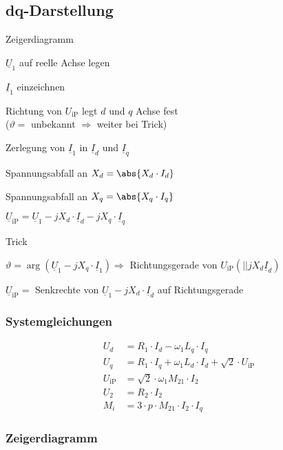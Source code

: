 \begin{sectionbox}
\subsection{dq-Darstellung}
\begin{cookbox}{Zeigerdiagramm}
\item $\underline{U}_1$ auf reelle Achse legen
\item $\underline{I}_1$ einzeichnen
\item Richtung von $U_\text{iP}$ legt $d$ und $q$ Achse fest\\
($\vartheta =$ unbekannt $\Rightarrow$ weiter bei Trick)
\item Zerlegung von $\underline{I}_1$ in $\underline{I}_d$ und $\underline{I}_q$
\item Spannungsabfall an $X_d = \abs{X_d\cdot I_d}$
\item Spannungsabfall an $X_q = \abs{X_q\cdot I_q}$
\item $\underline{U}_\text{iP} = \underline{U}_1 - jX_d\cdot\underline{I}_d - jX_q\cdot\underline{I}_q$
\end{cookbox}
\begin{cookbox}{Trick}
\item $\vartheta = \arg(\underline{U}_1 - jX_q\cdot\underline{I}_1) \Rightarrow$ Richtungsgerade von $U_\text{iP} (||jX_d \underline I_d)$
\item $\underline{U}_\text{iP} =$ Senkrechte von $\underline{U}_1 - jX_d\cdot\underline{I}_d$ auf Richtungsgerade
\end{cookbox}

\subsubsection{Systemgleichungen}
\begin{align*}
U_d &= R_1\cdot I_d - \omega_1 L_q\cdot I_q\\
U_q &= R_1\cdot I_q + \omega_1 L_d\cdot I_d + \sqrt{2}\cdot U_\text{iP}\\
U_\text{iP} &= \sqrt{2}\cdot \omega_1 M_{21}\cdot I_2\\
U_2 &= R_2\cdot I_2\\
M_i &= 3\cdot p\cdot M_{21}\cdot I_2\cdot I_q
\end{align*}

\subsubsection{Zeigerdiagramm}
\begin{center}

\end{center}
\end{sectionbox}

